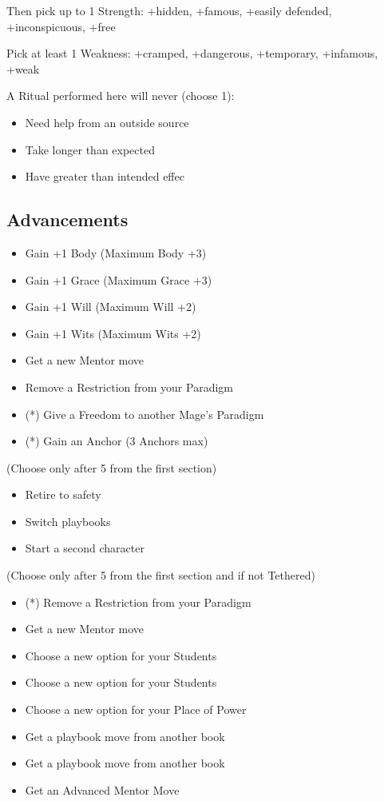 \documentclass[10pt,twoside,openright]{memoir}
\begin{document}
Then pick up to 1 Strength: +hidden, +famous, +easily defended,
+inconspicuous, +free

Pick at least 1 Weakness: +cramped, +dangerous, +temporary, +infamous,
+weak

A Ritual performed here will never (choose 1):

\begin{itemize}
\tightlist
\item
  Need help from an outside source
\item
  Take longer than expected
\item
  Have greater than intended effec
\end{itemize}

\hypertarget{advancements-1}{%
\subsection{Advancements}\label{advancements-1}}

\begin{itemize}
\tightlist
\item
  Gain +1 Body (Maximum Body +3)
\item
  Gain +1 Grace (Maximum Grace +3)
\item
  Gain +1 Will (Maximum Will +2)
\item
  Gain +1 Wits (Maximum Wits +2)
\item
  Get a new Mentor move
\item
  Remove a Restriction from your Paradigm
\item
  (*) Give a Freedom to another Mage's Paradigm
\item
  (*) Gain an Anchor (3 Anchors max)
\end{itemize}

(Choose only after 5 from the first section)

\begin{itemize}
\tightlist
\item
  Retire to safety
\item
  Switch playbooks
\item
  Start a second character
\end{itemize}

(Choose only after 5 from the first section and if not Tethered)

\begin{itemize}
\tightlist
\item
  (*) Remove a Restriction from your Paradigm
\item
  Get a new Mentor move
\item
  Choose a new option for your Students
\item
  Choose a new option for your Students
\item
  Choose a new option for your Place of Power
\item
  Get a playbook move from another book
\item
  Get a playbook move from another book
\item
  Get an Advanced Mentor Move
\end{itemize}
\end{document}
